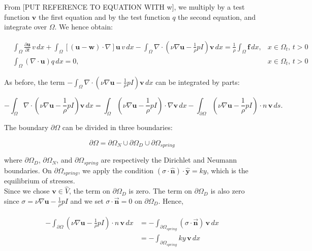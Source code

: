 \documentclass[11pt,a4paper,titlepage]{report}
\begin{document}
From [PUT REFERENCE TO EQUATION WITH w], we multiply by a test function $\mathbf{v}$ the first equation and by the test function $q$ the second equation, and integrate over $\Omega$. We hence obtain:


\[
\begin{aligned}
& \int_{\Omega} \frac{\partial \mathbf{u}}{\partial t} \, v \, dx 
+ \int_{\Omega} [(\mathbf{u - w}) \cdot \nabla] \mathbf{u} \, v \, dx
- \int_{\Omega} \nabla \cdot (\nu \nabla \mathbf{u} -  \frac{1}{\rho}  pI)\mathbf{v} \, dx
=  \frac{1}{\rho} \int_{\Omega} \mathbf{f} \, dx,  & x \in \Omega_t, \, t>0 \\
& \int_{\Omega}  (\nabla \cdot \mathbf{u}) q \, dx = 0 , & x \in \Omega_t, \, t>0
\end{aligned}
\]


As before, the term $- \int_{\Omega} \nabla \cdot (\nu \nabla \mathbf{u} -   \frac{1}{\rho}  pI)\mathbf{v} \, dx$ can be integrated by parts:

\[
- \int_{\Omega} \nabla \cdot (\nu \nabla \mathbf{u} -  \frac{1}{\rho} pI)\mathbf{v} \, dx =  \int_{\Omega} (\nu \nabla \mathbf{u} -  \frac{1}{\rho}  pI) \cdot \nabla \mathbf{v} \, dx - \int_{\partial \Omega} (\nu \nabla \mathbf{u} -  \frac{1}{\rho}  pI) \cdot n \, \mathbf{v} \, ds.
\]

The boundary $\partial \Omega$ can be divided in three boundaries:

\[
\partial \Omega = \partial \Omega_{N} \cup \partial \Omega_{D} \cup \partial \Omega_{spring}
\]

where $\partial \Omega_D$, $\partial \Omega_N$, and $\partial \Omega_{spring}$ are respectively the Dirichlet and Neumann boundaries. On $\partial \Omega_{spring}$, we apply the condition $(\sigma \cdot \hat{\mathbf{n}}) \cdot \mathbf{\hat{y}} = ky$, which is the equilibrium of stresses. \\
Since we chose $\mathbf{v} \in \hat{V}$, the term on $\partial \Omega_{D}$ is zero. The term on $\partial \Omega_{D}$ is also zero since $\sigma = \nu \nabla \mathbf{u} -  \frac{1}{\rho} pI$ and we set $\sigma \cdot \vec{\mathbf{n}} = 0$ on $\partial \Omega_{D}$. Hence, 

\[
\begin{aligned}
- \int_{\partial \Omega} (\nu \nabla \mathbf{u} -  \frac{1}{\rho}  pI) \cdot n \, \mathbf{v} \, dx & =
- \int_{\partial \Omega_{spring}} (\sigma \cdot \vec{\mathbf{n}}) \, \mathbf{v} \, dx \\
& = - \int_{\partial \Omega_{spring}} ky \, \mathbf{v} \, dx 
\end{aligned}
\]
\end{document}
